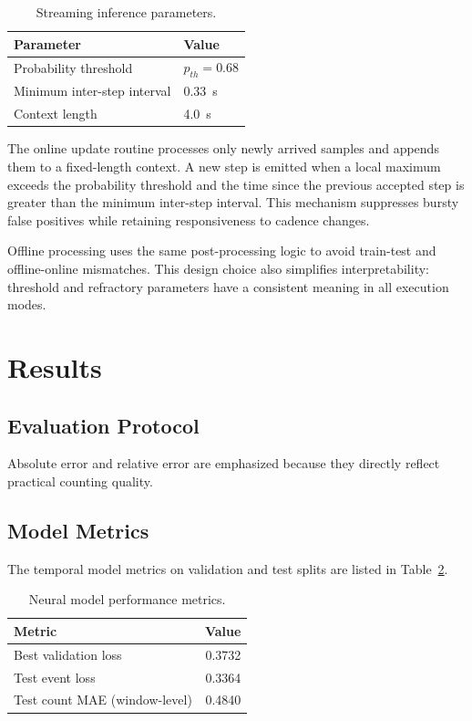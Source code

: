 \begin{table}[H]
\centering
\caption{Streaming inference parameters.}
\label{tab:infer_params}
\small
\begin{tabular}{ll}
\toprule
Parameter & Value \\
\midrule
Probability threshold & $p_{th}=0.68$ \\
Minimum inter-step interval & 0.33~s \\
Context length & 4.0~s \\
\bottomrule
\end{tabular}
\end{table}

The online update routine processes only newly arrived samples and appends them to a fixed-length context. A new step is emitted when a local maximum exceeds the probability threshold and the time since the previous accepted step is greater than the minimum inter-step interval. This mechanism suppresses bursty false positives while retaining responsiveness to cadence changes.

Offline processing uses the same post-processing logic to avoid train-test and offline-online mismatches. This design choice also simplifies interpretability: threshold and refractory parameters have a consistent meaning in all execution modes.

\section{Results}
\subsection{Evaluation Protocol}
Absolute error and relative error are emphasized because they directly reflect practical counting quality.


\subsection{Model Metrics}
The temporal model metrics on validation and test splits are listed in Table~\ref{tab:model_metrics}.

\begin{table}[H]
\centering
\caption{Neural model performance metrics.}
\label{tab:model_metrics}
\small
\begin{tabular}{lr}
\toprule
Metric & Value \\
\midrule
Best validation loss & 0.3732 \\
Test event loss & 0.3364 \\
Test count MAE (window-level) & 0.4840 \\
\bottomrule
\end{tabular}
\end{table}


